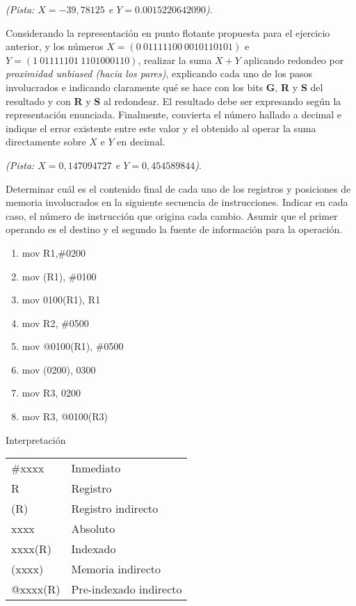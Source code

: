 \documentclass[12pt,a4paper]{article}
\begin{document}
\textit{(Pista: $X=-39,78125$ e $Y= 0.0015220642090$)}.

 Considerando la representación en punto flotante propuesta para el ejercicio anterior, y los números $X = (0 \ 01111100 \ 0010110101)$ e $Y = (1 \ 01111101 \ 1101000110)$, realizar la suma $X + Y$ aplicando redondeo por \textit{proximidad unbiased (hacia los pares)}, explicando cada uno de los pasos involucrados e indicando claramente qué se hace con los bits \textbf{G}, \textbf{R} y \textbf{S} del resultado y con \textbf{R} y \textbf{S} al redondear. El resultado debe ser expresando según la representación enunciada. Finalmente, convierta el número hallado a decimal e indique el error existente entre este valor y el obtenido al operar la suma directamente sobre $X$ e $Y$ en decimal. 

\textit{(Pista: $X=0,147094727$ e $Y=0,454589844$)}.

 Determinar cuál es el contenido final de cada uno de los registros y posiciones de memoria involucrados en la siguiente secuencia de instrucciones. Indicar en cada caso, el número de instrucción que origina cada cambio. Asumir que el primer operando es el destino y el segundo la fuente de información para la operación.
\begin{center}
	\begin{minipage}{0.4\textwidth}
		\begin{enumerate}[(1)]
			\itemsep -5pt
			\item mov R1,\#0200
			\item mov (R1), \#0100
			\item mov 0100(R1), R1
			\item mov R2, \#0500
			\item mov @0100(R1), \#0500
			\item mov (0200), 0300
			\item mov R3, 0200
			\item mov R3, @0100(R3)
		\end{enumerate}
	\end{minipage}
	\begin{minipage}{0.4\textwidth}
		Interpretación
		\begin{tabular}{ll}
			\#xxxx   & Inmediato\\
			R       & Registro \\
			(R)     & Registro indirecto\\
			xxxx    & Absoluto \\
			xxxx(R) & Indexado \\
			(xxxx)  & Memoria indirecto\\
			@xxxx(R) & Pre-indexado indirecto
		\end{tabular}
	\end{minipage}
\end{center}
\end{document}
